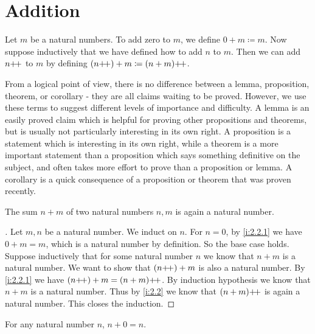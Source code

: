 \section{Addition}\label{i:sec:2.2}

\begin{defn}\label{i:2.2.1}
  Let \(m\) be a natural numbers.
  To add zero to \(m\), we define \(0 + m \coloneqq m\).
  Now suppose inductively that we have defined how to add \(n\) to \(m\).
  Then we can add \(n{+}\!{+}\) to \(m\) by defining \((n{+}\!{+}) + m \coloneqq (n + m){+}\!{+}\).
\end{defn}

\begin{note}
  From a logical point of view, there is no difference between a lemma, proposition, theorem, or corollary
  - they are all claims waiting to be proved.
  However, we use these terms to suggest different levels of importance and difficulty.
  A lemma is an easily proved claim which is helpful for proving other propositions and theorems, but is usually not particularly interesting in its own right.
  A proposition is a statement which is interesting in its own right, while a theorem is a more important statement than a proposition which says something definitive on the subject, and often takes more effort to prove than a proposition or lemma.
  A corollary is a quick consequence of a proposition or theorem that was proven recently.
\end{note}

\begin{ac}\label{i:ac:2.2.1}
  The sum \(n + m\) of two natural numbers \(n, m\) is again a natural number.
\end{ac}

\begin{proof}[]
  Let \(m, n\) be a natural number.
  We induct on \(n\).
  For \(n = 0\), by \cref{i:2.2.1} we have \(0 + m = m\), which is a natural number by definition.
  So the base case holds.
  Suppose inductively that for some natural number \(n\) we know that \(n + m\) is a natural number.
  We want to show that \((n{+}\!{+}) + m\) is also a natural number.
  By \cref{i:2.2.1} we have \((n{+}\!{+}) + m = (n + m){+}\!{+}\).
  By induction hypothesis we know that \(n + m\) is a natural number.
  Thus by \cref{i:2.2} we know that \((n + m){+}\!{+}\) is again a natural number.
  This closes the induction.
\end{proof}

\begin{lem}\label{i:2.2.2}
  For any natural number \(n\), \(n + 0 = n\).
\end{lem}

